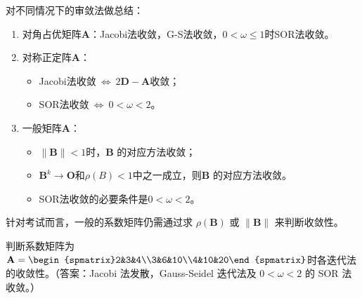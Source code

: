 \entry 对不同情况下的审敛法做总结：
\begin{enumerate}\tl
    \item 对角占优矩阵$\mathbf{A}$：Jacobi法收敛，G-S法收敛，$0<\omega\leq1$时SOR法收敛。
    \item 对称正定阵$\mathbf{A}$：
    \begin{itemize}\tl
        \item Jacobi法收敛$\ \Leftrightarrow\ 2\mathbf{D-A}$收敛；
        \item SOR法收敛$\ \Leftrightarrow\ 0<\omega<2$。
    \end{itemize}
    \item 一般矩阵$\mathbf{A}$：
    \begin{itemize}\tl
        \item $\|\mathbf{B}\|<1$时，$\mathbf{B}$ 的对应方法收敛；
        \item $\mathbf{B}^k\to\mathbf{O}$和$\rho(B)<1$中之一成立，则$\mathbf{B}$ 的对应方法收敛。
        \item SOR法收敛的必要条件是$0<\omega<2$。
    \end{itemize}
\end{enumerate}

\entry 针对考试而言，一般的系数矩阵仍需通过求 $\rho(\mathbf{B})$ 或 $\|\mathbf{B}\|$ 来判断收敛性。

\example 判断系数矩阵为$\mathbf{A}=\begin{spmatrix}2&3&4\\3&6&10\\4&10&20\end{spmatrix}$时各迭代法的收敛性。（答案：Jacobi 法发散，Gauss-Seidel 迭代法及 $0<\omega<2$ 的 SOR 法收敛。）
